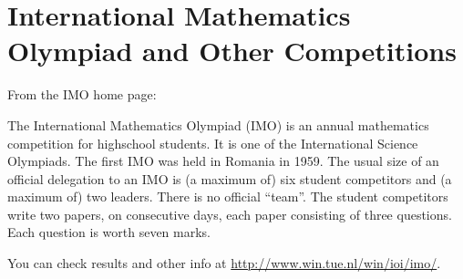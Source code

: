 \section{International Mathematics Olympiad and Other Competitions}

From the IMO home page:

The International Mathematics Olympiad (IMO) is an annual mathematics 
competition for highschool students. It is one of the International 
Science Olympiads. The first IMO was held in Romania in 1959. The
usual size of an official delegation to an IMO is (a maximum of) 
six student competitors and (a maximum of) two leaders. There is no 
official ``team''. The student competitors write two papers, on 
consecutive days, each paper consisting of three questions. Each question 
is worth seven marks. 

You can check results and other info at
\url{http://www.win.tue.nl/win/ioi/imo/}.
